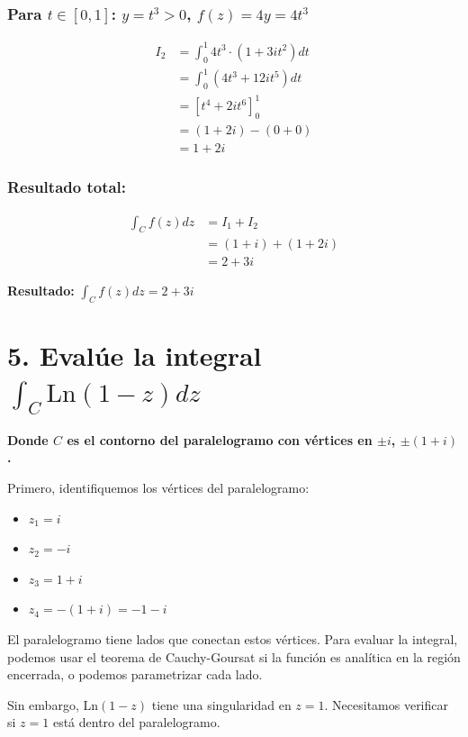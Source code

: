 \documentclass{article}
\begin{document}
\subsubsection*{Para $t \in [0, 1]$: $y = t^3 > 0$, $f(z) = 4y = 4t^3$}

\begin{align*}
I_2 &= \int_0^1 4t^3 \cdot (1 + 3it^2) dt \\
    &= \int_0^1 (4t^3 + 12it^5) dt \\
    &= \left[t^4 + 2it^6\right]_0^1 \\
    &= (1 + 2i) - (0 + 0) \\
    &= 1 + 2i
\end{align*}

\subsubsection*{Resultado total:}

\begin{align*}
\int_C f(z) dz &= I_1 + I_2 \\
               &= (1 + i) + (1 + 2i) \\
               &= 2 + 3i
\end{align*}

\textbf{Resultado:} $\int_C f(z) dz = 2 + 3i$

\newpage
\section*{5. Evalúe la integral $\int_C \text{Ln}(1 - z) dz$}

\textbf{Donde $C$ es el contorno del paralelogramo con vértices en $\pm i$, $\pm(1 + i)$.}

Primero, identifiquemos los vértices del paralelogramo:
\begin{itemize}
\item $z_1 = i$
\item $z_2 = -i$
\item $z_3 = 1 + i$
\item $z_4 = -(1 + i) = -1 - i$
\end{itemize}

El paralelogramo tiene lados que conectan estos vértices. Para evaluar la integral, podemos usar el teorema de Cauchy-Goursat si la función es analítica en la región encerrada, o podemos parametrizar cada lado.

Sin embargo, $\text{Ln}(1 - z)$ tiene una singularidad en $z = 1$. Necesitamos verificar si $z = 1$ está dentro del paralelogramo.
\end{document}

